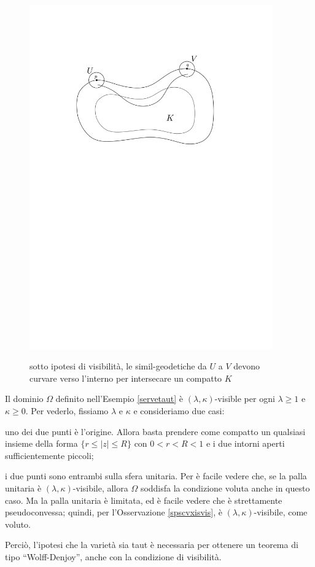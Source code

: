 \begin{figure}[h!]
    \begin{center}
        \includegraphics[width=0.935\textwidth, trim=0 18cm 0 5cm]{Immagini/vis2.png} \\
        \caption{sotto ipotesi di visibilità, le simil-geodetiche da $U$ a $V$ devono curvare verso l'interno per intersecare un compatto $K$}
    \end{center}
\end{figure}

\begin{ex}
    Il dominio $\Omega$ definito nell'Esempio \ref{servetaut} è $(\lambda,\kappa)$-visible per ogni $\lambda \ge 1$ e $\kappa \ge 0$. Per vederlo, fissiamo $\lambda$ e $\kappa$ e consideriamo due casi:
    \begin{nlist}
        \item uno dei due punti è l'origine. Allora basta prendere come compatto un qualsiasi insieme della forma $\{r \le |z| \le R\}$ con $0<r<R<1$ e i due intorni aperti sufficientemente piccoli;
        \item i due punti sono entrambi sulla sfera unitaria. Per \cite[Proposition 6]{NTT} è facile vedere che, se la palla unitaria è $(\lambda,\kappa)$-visibile, allora $\Omega$ soddisfa la condizione voluta anche in questo caso. Ma la palla unitaria è limitata, ed è facile vedere che è strettamente pseudoconvessa; quindi, per l'Osservazione \ref{spscvxisvis}, è $(\lambda,\kappa)$-visibile, come voluto.
    \end{nlist}
    Perciò, l'ipotesi che la varietà sia taut è necessaria per ottenere un teorema di tipo ``Wolff-Denjoy'', anche con la condizione di visibilità.
\end{ex}